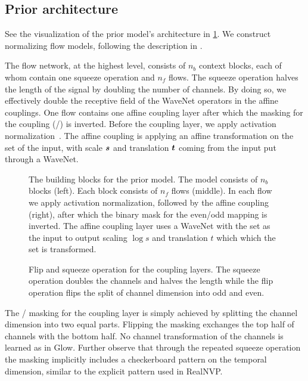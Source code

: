 \subsection{Prior architecture}

See the visualization of the prior model's architecture in \cref{fig:prior_network}. We construct normalizing flow models, following the description in \textcite{kimFloWaveNet2019}.

The flow network, at the highest level, consists of \(n_b\) context blocks, each of whom contain one squeeze operation and \(n_f\) flows. The squeeze operation halves the length of the signal by doubling the number of channels. By doing so, we effectively double the receptive field of the WaveNet operators in the affine couplings. One flow contains one affine coupling layer after which the masking for the coupling (/) is inverted. Before the coupling layer, we apply activation normalization~\cite{kingmaGlow2018}. The affine coupling is applying an affine transformation on the  set of the input, with scale \(\s\) and translation \(\B{t}\) coming from the  input put through a  WaveNet.

\begin{figure}[t]
    
    \caption{The building blocks for the prior model. The model consists of \(n_b\) blocks (left). Each block consists of \(n_f\) flows (middle). In each flow we apply activation normalization, followed by the affine coupling (right), after which the binary mask for the even/odd mapping is inverted. The affine coupling layer uses a WaveNet with the  set as the input to output scaling \(\log s\) and translation \(t\) which which the  set is transformed.}%
    \label{fig:prior_network}
\end{figure}

\begin{figure}
    \centering
    \caption{Flip and squeeze operation for the coupling layers. The squeeze operation doubles the channels and halves the length while the flip operation flips the split of channel dimension into {\color{orange!70}odd} and {\color{blue!70}even}.}%
    \label{fig:squeeze}%
\end{figure}

The / masking for the coupling layer is simply achieved by splitting the channel dimension into two equal parts. Flipping the masking exchanges the top half of channels with the bottom half. No channel transformation of the channels is learned as in Glow. Further observe that through the repeated squeeze operation the masking implicitly includes a checkerboard pattern on the temporal dimension, similar to the explicit pattern used in RealNVP\@.

